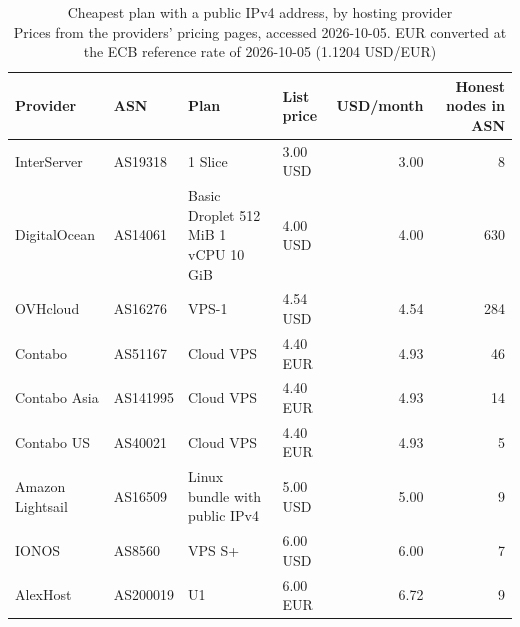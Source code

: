 \begin{table}[t]
\caption{
{\fontsize{20}{25}\selectfont  Cheapest plan with a public IPv4 address, by hosting provider} \\ 
{\fontsize{14}{17}\selectfont  Prices from the providers' pricing pages, accessed 2026-10-05. EUR converted at the ECB reference rate of 2026-10-05 (1.1204 USD/EUR)}
} 
\begin{tabular*}{\linewidth}{@{\extracolsep{\fill}}llllrr}
\toprule
Provider & ASN & Plan & List price & USD/month & Honest nodes in ASN \\ 
\midrule\addlinespace[2.5pt]
InterServer & AS19318 & 1 Slice & 3.00 USD & 3.00 & 8 \\ 
DigitalOcean & AS14061 & Basic Droplet 512 MiB 1 vCPU 10 GiB & 4.00 USD & 4.00 & 630 \\ 
OVHcloud & AS16276 & VPS-1 & 4.54 USD & 4.54 & 284 \\ 
Contabo & AS51167 & Cloud VPS & 4.40 EUR & 4.93 & 46 \\ 
Contabo Asia & AS141995 & Cloud VPS & 4.40 EUR & 4.93 & 14 \\ 
Contabo US & AS40021 & Cloud VPS & 4.40 EUR & 4.93 & 5 \\ 
Amazon Lightsail & AS16509 & Linux bundle with public IPv4 & 5.00 USD & 5.00 & 9 \\ 
IONOS & AS8560 & VPS S+ & 6.00 USD & 6.00 & 7 \\ 
AlexHost & AS200019 & U1 & 6.00 EUR & 6.72 & 9 \\ 
\bottomrule
\end{tabular*}
\label{table-prices}
\end{table}
